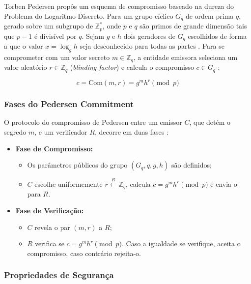 Torben Pedersen propôs um esquema de compromisso baseado na dureza do Problema do Logaritmo Discreto. Para um grupo cíclico $G_q$ de ordem prima $q$, gerado sobre um subgrupo de $\mathbb{Z}_p^*$, onde $p$ e $q$ são primos de grande dimensão tais que $p-1$ é divisível por $q$. Sejam $g$ e $h$ dois geradores de $G_q$ escolhidos de forma a que o valor $x = \log_g h$ seja desconhecido para todas as partes \cite{reaction_la_pedersen}. Para se comprometer com um valor secreto $m \in \mathbb{Z}_q$, a entidade emissora seleciona um valor aleatório $r \in \mathbb{Z}_q$ (\textit{blinding factor}) e calcula o compromisso $c \in G_q$ \cite{reaction_la_pedersen}:

\begin{equation*}
    c = \mathrm{Com}(m, r) = g^m h^r \pmod{p}
\end{equation*}

\subsubsection{Fases do Pedersen Commitment}

O protocolo do compromisso de Pedersen entre um emissor $C$, que detém o segredo $m$, e um verificador $R$, decorre em duas fases \cite{metere2017automated}:

\begin{itemize}
    \item \textbf{Fase de Compromisso:}
    \begin{itemize}
        \item Os parâmetros públicos do grupo $(G_q, q, g, h)$ são definidos;
        \item $C$ escolhe uniformemente $r \xleftarrow{R} \mathbb{Z}_q$, calcula $c = g^m h^r \pmod{p}$ e envia-o para $R$.
    \end{itemize}
    \item \textbf{Fase de Verificação:}
    \begin{itemize}
        \item $C$ revela o par $(m, r)$ a $R$;
        \item $R$ verifica se $c = g^m h^r \pmod{p}$. Caso a igualdade se verifique, aceita o compromisso, caso contrário rejeita-o.
    \end{itemize}
\end{itemize}

\subsubsection{Propriedades de Segurança}

